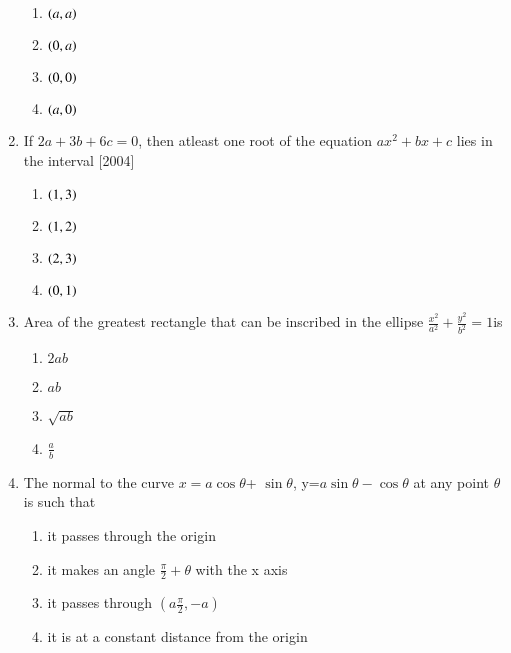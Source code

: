 \documentclass[journal,12pt,twocolumn]{IEEEtran}
\theoremstyle{remark}
\begin{document}
\begin{enumerate}
\begin{multicols}{2}
\begin{enumerate}
													     \item $\left(a,a\right)$
													         \item $\left(0,a\right)$
														     \item $\left(0,0\right)$
														         \item $\left(a,0\right)$
															 \end{enumerate}
															 \end{multicols}
															 \item If $2a+3b+6c=0$, then atleast one root of the equation $ax^2+bx+c$ lies in the interval \hfill{[2004]}
															 \begin{multicols}{2}
															 \begin{enumerate}
															     \item $\left(1,3\right)$
															         \item $\left(1,2\right)$
																     \item $\left(2,3\right)$
																         \item $\left(0,1\right)$
																	 \end{enumerate}
																	 \end{multicols}  
																	  \item Area of the greatest rectangle that can be inscribed in the ellipse $\frac{x^2}{a^2}+\frac{y^2}{b^2}=1$is
																	  \begin{multicols}{2}
																	  \begin{enumerate}
																	      \item $2ab$
																	          \item $ab$
																		      \item $\sqrt{ab}$
																		          \item $\frac{a}{b}$
																			  \end{enumerate}
																			  \end{multicols}
																			  \item The normal to the curve $x=a \cos \theta$+ $\sin\theta$, y=$a\sin\theta - \cos \theta$ at any point $\theta$ is such that
																			  \begin{multicols}{2}
																			  \begin{enumerate}
																			      \item it passes through the origin
																			          \item it makes an angle $\frac{\pi}{2}+\theta$ with the x axis
																				      \item it passes through $(a\frac{\pi}{2},-a)$
																				          \item it is at a constant distance from the origin
																					  \end{enumerate}
																					  \end{multicols}
																					  \end{enumerate}
\end{document}
